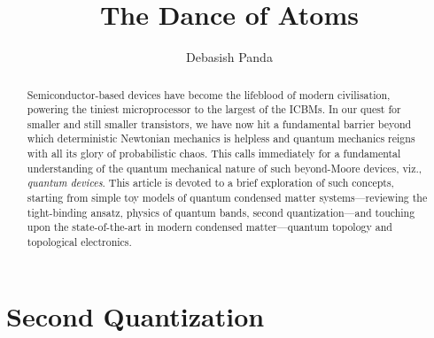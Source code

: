 \documentclass{resonance}
\begin{document}
\title{The Dance of Atoms}
\author{Debasish Panda}

\maketitle
\begin{abstract}
Semiconductor-based devices have become the lifeblood of modern civilisation, powering the tiniest microprocessor to the largest of the ICBMs. In our quest for smaller and still smaller transistors, we have now hit a fundamental barrier beyond which deterministic Newtonian mechanics is helpless and quantum mechanics reigns with all its glory of probabilistic chaos. This calls immediately for a fundamental understanding of the quantum mechanical nature of such beyond-Moore devices, viz., \textit{quantum devices}. This article is devoted to a brief exploration of such concepts, starting from simple toy models of quantum condensed matter systems---reviewing the tight-binding ansatz, physics of quantum bands, second quantization---and touching upon the state-of-the-art in modern condensed matter---quantum topology and topological electronics.  
\end{abstract}


\section{Second Quantization}
\end{document}
